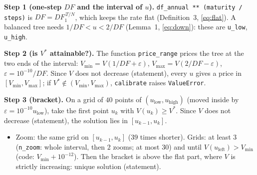 \documentclass[11pt,a4paper]{article}
\newcommand{\step}[1]{\par\smallskip\noindent\textbf{#1}\enspace\ignorespaces}
\newcommand{\ul}{u_{\text{left}}}
\begin{document}
\step{Step 1 (one-step $DF$ and the interval of $u$).} \texttt{df\_annual ** (maturity / steps)} is $DF=DF_1^{\,T/N}$, which keeps the rate flat (Definition~3, \eqref{eq:flat}). A balanced tree needs $1/DF<u<2/DF$ (Lemma~1, \eqref{eq:down}): these are \texttt{u\_low}, \texttt{u\_high}.

\step{Step 2 (is $V^*$ attainable?).} The function \texttt{price\_range} prices the tree at the two ends of the interval: $V_{\min}=V(1/DF+\varepsilon)$, $V_{\max}=V(2/DF-\varepsilon)$, $\varepsilon=10^{-10}/DF$. Since $V$ does not decrease (statement), every $u$ gives a price in $[V_{\min},V_{\max}]$; if $V^*\notin(V_{\min},V_{\max})$, \texttt{calibrate} raises \texttt{ValueError}.

\begin{center}
\label{fig:s2}
\end{center}

\step{Step 3 (bracket).} On a grid of $40$ points of $(u_{\text{low}},u_{\text{high}})$ (moved inside by $\varepsilon=10^{-10}u_{\text{low}}$), take the first point $u_k$ with $V(u_k)\ge V^*$. Since $V$ does not decrease (statement), the solution lies in $[u_{k-1},u_k]$.
\begin{itemize}
\item Zoom: the same grid on $[u_{k-1},u_k]$ ($39$ times shorter). Grids: at least $3$ (\texttt{n\_zoom}: whole interval, then $2$ zooms; at most $30$) and until $V(\ul)>V_{\min}$ (code: $V_{\min}+10^{-12}$). Then the bracket is above the flat part, where $V$ is strictly increasing: unique solution (statement).
\end{itemize}
\end{document}
